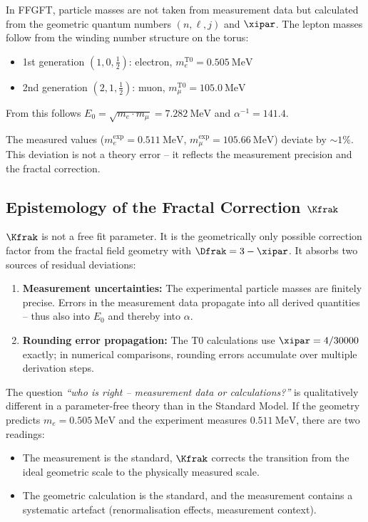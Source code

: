 In FFGFT, particle masses are not taken from measurement data but calculated from the geometric quantum numbers $(n, \ell, j)$ and $\xipar$. The lepton masses follow from the winding number structure on the torus:
\begin{itemize}[noitemsep]
  \item 1st generation $(1,0,\tfrac{1}{2})$: electron, $m_e^{\text{T0}} = 0.505\ \text{MeV}$
  \item 2nd generation $(2,1,\tfrac{1}{2})$: muon, $m_\mu^{\text{T0}} = 105.0\ \text{MeV}$
\end{itemize}

From this follows $E_0 = \sqrt{m_e \cdot m_\mu} = 7.282\ \text{MeV}$ and $\alpha^{-1} = 141.4$.

The measured values ($m_e^{\text{exp}} = 0.511\ \text{MeV}$, $m_\mu^{\text{exp}} = 105.66\ \text{MeV}$) deviate by $\sim 1\%$. This deviation is not a theory error -- it reflects the measurement precision and the fractal correction.

\subsection{\texorpdfstring{Epistemology of the Fractal Correction $\Kfrak$}{Epistemology of the Fractal Correction}}

$\Kfrak$ is not a free fit parameter. It is the geometrically only possible correction factor from the fractal field geometry with $\Dfrak = 3 - \xipar$. It absorbs two sources of residual deviations:

\begin{enumerate}[noitemsep]
  \item \textbf{Measurement uncertainties:} The experimental particle masses are finitely precise. Errors in the measurement data propagate into all derived quantities -- thus also into $E_0$ and thereby into $\alpha$.
  \item \textbf{Rounding error propagation:} The T0 calculations use $\xipar = 4/30000$ exactly; in numerical comparisons, rounding errors accumulate over multiple derivation steps.
\end{enumerate}

The question \textit{``who is right -- measurement data or calculations?''} is qualitatively different in a parameter-free theory than in the Standard Model. If the geometry predicts $m_e = 0.505\ \text{MeV}$ and the experiment measures $0.511\ \text{MeV}$, there are two readings:

\begin{itemize}[noitemsep]
  \item The measurement is the standard, $\Kfrak$ corrects the transition from the ideal geometric scale to the physically measured scale.
  \item The geometric calculation is the standard, and the measurement contains a systematic artefact (renormalisation effects, measurement context).
\end{itemize}

